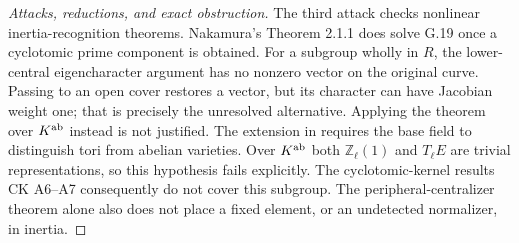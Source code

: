 \begin{proof}[Attacks, reductions, and exact obstruction]
The third attack checks nonlinear inertia-recognition theorems.
Nakamura's Theorem 2.1.1 does solve G.19 once a cyclotomic
prime component is obtained. For a subgroup wholly in $R$, the
lower-central eigencharacter argument has no nonzero vector on
the original curve. Passing to an open cover restores a vector,
but its character can have Jacobian weight one; that is precisely
the unresolved alternative. Applying the theorem over $K^{\rm ab}$
instead is not justified. The extension in
\citet[\S5, Theorem 20 and Corollary 22]{Stix2008Cuspidal}
requires the base field to distinguish tori from abelian varieties.
Over $K^{\rm ab}$ both $\mathbb Z_\ell(1)$ and $T_\ell E$
are trivial representations, so this hypothesis fails explicitly.
The cyclotomic-kernel results CK A6--A7 consequently do not cover
this subgroup. The peripheral-centralizer theorem alone also does
not place a fixed element, or an undetected normalizer, in inertia.
\end{proof}
